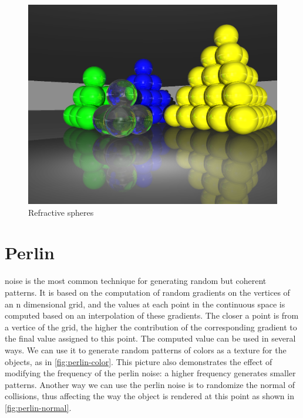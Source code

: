 \documentclass[a4paper,12pt,journal,twoside,compsoc]{PPIEEEtran}
\begin{document}
\begin{figure}
  \begin{center}
    \includegraphics[width=0.7\linewidth]{sample-refraction.png}
  \end{center}
  \caption{Refractive spheres}
  \label{fig:sample-refr}
\end{figure}

\section{Perlin}
noise is the most common technique for generating random but coherent
patterns.  It is based on the computation of random gradients on the vertices of
an n dimensional grid, and the values at each point in the continuous space is
computed based on an interpolation of these gradients.  The closer a point is
from a vertice of the grid, the higher the contribution of the corresponding
gradient to the final value assigned to this point.  The computed value can be
used in several ways.  We can use it to generate random patterns of colors as a
texture for the objects, as in \cref{fig:perlin-color}.  This picture also
demonstrates the effect of modifying the frequency of the perlin noise: a higher
frequency generates smaller patterns.  Another way we can use the perlin noise
is to randomize the normal of collisions, thus affecting the way the object
is rendered at this point as shown in \cref{fig:perlin-normal}.
\end{document}
